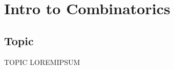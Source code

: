
\newcommand{\laClass}       {CS 211}
\newcommand{\laSemester}    {Fall 2017}
\newcommand{\laChapter}     {5.1}
\newcommand{\laType}        {Exercise}
\newcommand{\laPoints}      {5}
\newcommand{\laTitle}       {Intro to Combinatorics}
\setcounter{chapter}{5}
\setcounter{section}{1}
\addtocounter{section}{-1}
\toggletrue{answerkey}





    \section{\laTitle}

    \subsection{Topic}

    \begin{intro}{TOPIC}
        LOREMIPSUM
    \end{intro}

\notonkey{ \newpage }{ \hrulefill } %




